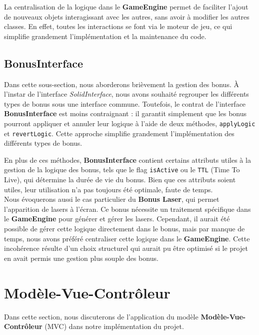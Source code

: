 \documentclass{article}
\begin{document}
\noindent La centralisation de la logique dans le \textbf{GameEngine} permet de faciliter l'ajout de nouveaux objets interagissant avec les autres, sans avoir à modifier les autres classes. En effet, toutes les interactions se font via le moteur de jeu, ce qui simplifie grandement l'implémentation et la maintenance du code.

\subsection{BonusInterface}

\noindent Dans cette sous-section, nous aborderons brièvement la gestion des bonus. À l'instar de l'interface \textit{SolidInterface}, nous avons souhaité regrouper les différents types de bonus sous une interface commune. Toutefois, le contrat de l'interface \textbf{BonusInterface} est moins contraignant : il garantit simplement que les bonus pourront appliquer et annuler leur logique à l'aide de deux méthodes, \texttt{applyLogic} et \texttt{revertLogic}. Cette approche simplifie grandement l'implémentation des différents types de bonus. 

\noindent En plus de ces méthodes, \textbf{BonusInterface} contient certains attributs utiles à la gestion de la logique des bonus, tels que le flag \texttt{isActive} ou le \texttt{TTL} (Time To Live), qui détermine la durée de vie du bonus. Bien que ces attributs soient utiles, leur utilisation n'a pas toujours été optimale, faute de temps. \\

\noindent Nous évoquerons aussi le cas particulier du \textbf{Bonus Laser}, qui permet l'apparition de lasers à l'écran. Ce bonus nécessite un traitement spécifique dans le \textbf{GameEngine} pour générer et gérer les lasers. Cependant, il aurait été possible de gérer cette logique directement dans le bonus, mais par manque de temps, nous avons préféré centraliser cette logique dans le \textbf{GameEngine}. Cette incohérence résulte d'un choix structurel qui aurait pu être optimisé si le projet en avait permis une gestion plus souple des bonus.






\section{Modèle-Vue-Contrôleur}

\noindent Dans cette section, nous discuterons de l'application du modèle \textbf{Modèle-Vue-Contrôleur} (MVC) dans notre implémentation du projet.
\end{document}
